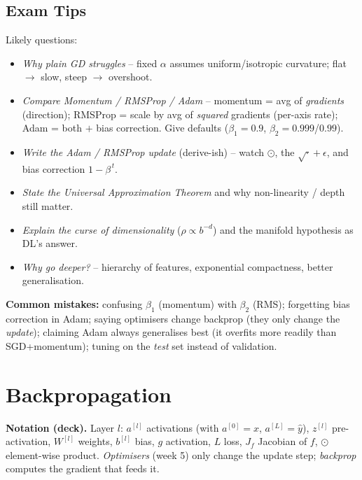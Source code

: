 \documentclass[10pt,a4paper]{article}
\begin{document}
	\subsection{Exam Tips}

	\begin{examtipbox}
		Likely questions:
		\begin{itemize}[leftmargin=*]
			\item \emph{Why plain GD struggles} -- fixed $\alpha$ assumes uniform/isotropic curvature; flat $\rightarrow$ slow, steep $\rightarrow$ overshoot.
			\item \emph{Compare Momentum / RMSProp / Adam} -- momentum = avg of \emph{gradients} (direction); RMSProp = scale by avg of \emph{squared} gradients (per-axis rate); Adam = both $+$ bias correction. Give defaults ($\beta_1{=}0.9$, $\beta_2{=}0.999$/$0.99$).
			\item \emph{Write the Adam / RMSProp update} (derive-ish) -- watch $\odot$, the $\sqrt{\cdot}+\epsilon$, and bias correction $1-\beta^{\,t}$.
			\item \emph{State the Universal Approximation Theorem} and why non-linearity / depth still matter.
			\item \emph{Explain the curse of dimensionality} ($\rho\propto b^{-d}$) and the manifold hypothesis as DL's answer.
			\item \emph{Why go deeper?} -- hierarchy of features, exponential compactness, better generalisation.
		\end{itemize}
		\textbf{Common mistakes:} confusing $\beta_1$ (momentum) with $\beta_2$ (RMS); forgetting bias correction in Adam; saying optimisers change backprop (they only change the \emph{update}); claiming Adam always generalises best (it overfits more readily than SGD+momentum); tuning on the \emph{test} set instead of validation.
	\end{examtipbox}
	\section{Backpropagation}

	\begin{importantbox}
		\textbf{Notation (deck).} Layer $l$: $a^{[l]}$ activations (with $a^{[0]}=x$, $a^{[L]}=\hat y$), $z^{[l]}$ pre-activation, $W^{[l]}$ weights, $b^{[l]}$ bias, $g$ activation, $L$ loss, $J_f$ Jacobian of $f$, $\odot$ element-wise product. \emph{Optimisers} (week 5) only change the update step; \emph{backprop} computes the gradient that feeds it.
	\end{importantbox}
\end{document}
